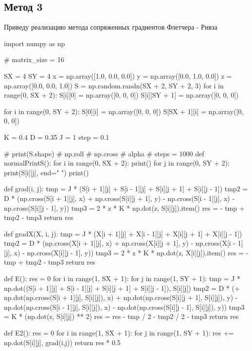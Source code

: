\documentclass[ 12pt,x11names]{article}
\begin{document}
\subsection{Метод 3}
 Приведу реализацию метода сопряженных градиентов Флетчера - Ривза
 \begin{python}
import numpy as np

# matrix_size = 16


SX = 4
SY = 4
x = np.array([1.0, 0.0, 0.0])
y = np.array([0.0, 1.0, 0.0])
z = np.array([0.0, 0.0, 1.0])
S = np.random.randn(SX + 2, SY + 2, 3)
for i in range(0, SX + 2):
    S[i][0] = np.array([0, 0, 0])
    S[i][SY + 1] = np.array([0, 0, 0])

for i in range(0, SY + 2):
    S[0][i] = np.array([0, 0, 0])
    S[SX + 1][i] = np.array([0, 0, 0])

K = 0.4
D = 0.35
J = 1
step = 0.1

# print(S.shape)
# np.roll
# np.cross
# alpha
# steps = 1000
def normalPrintS():
    for i in range(0, SX + 2):
        print()
        for j in range(0, SY + 2):
            print(S[i][j], end=" ")
    print()


def grad(i, j):
    tmp = J * (S[i + 1][j] + S[i - 1][j] + S[i][j + 1] + S[i][j - 1])
    tmp2 = D * (np.cross(S[i + 1][j], x) + np.cross(S[i][j + 1], y) - np.cross(S[i - 1][j], x) - np.cross(S[i][j - 1], y))
    tmp3 = 2 * z * K * np.dot(z, S[i][j]).item()
    res = - tmp + tmp2 - tmp3
    return res

def gradX(X, i, j):
    tmp = J * (X[i + 1][j] + X[i - 1][j] + X[i][j + 1] + X[i][j - 1])
    tmp2 = D * (np.cross(X[i + 1][j], x) + np.cross(X[i][j + 1], y) - np.cross(X[i - 1][j], x) - np.cross(X[i][j - 1], y))
    tmp3 = 2 * z * K * np.dot(z, X[i][j]).item()
    res = - tmp + tmp2 - tmp3
    return res



def E():
    res = 0
    for i in range(1, SX + 1):
        for j in range(1, SY + 1):
            tmp = J * np.dot((S[i + 1][j] + S[i - 1][j] + S[i][j + 1] + S[i][j - 1]), S[i][j])
            tmp2 = D * (+ np.dot(np.cross(S[i + 1][j], S[i][j]), x)
                        + np.dot(np.cross(S[i][j + 1], S[i][j]), y)
                        - np.dot(np.cross(S[i - 1][j], S[i][j]), x)
                        - np.dot(np.cross(S[i][j - 1], S[i][j]), y))
            tmp3 = K * (np.dot(z, S[i][j]) ** 2)
            res = res - tmp / 2 - tmp2 / 2 - tmp3
    return res

def E2():
    res = 0
    for i in range(1, SX + 1):
        for j in range(1, SY + 1):
            res += np.dot(S[i][j], grad(i,j))
    return res * 0.5


\end{python}
\end{document}
